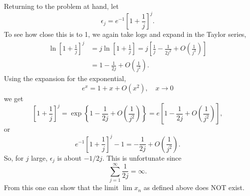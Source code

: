 \documentclass{stml-l}
\theoremstyle{definition}
\numberwithin{equation}{chapter}
\numberwithin{figure}{chapter}
\numberwithin{figure}{section}
\begin{document}
Returning to the problem at hand, let
\begin{equation*}
\epsilon_{j}=e^{-1}\left[1+\frac{1}{j}\right]^{j}.
\end{equation*}
To see how close this is to 1, we again take logs and expand in the Taylor series,
\begin{align*}
\ln\left[1+\frac{1}{j}\right]^{j}&=j\ln\left[1+\frac{1}{j}\right]=j\left[\frac{1}{j}-\frac{1}{2j^{2}}+O\left(\frac{1}{j^{3}}\right)\right]\\
&=1-\frac{1}{2j}+O\left(\frac{1}{j^{2}}\right).
\end{align*}
Using the expansion for the exponential,
\begin{equation*}
e^{x}=1+x+O(x^{2}),\quad x\rightarrow 0
\end{equation*}
we get
\begin{equation*}
\left[1+\frac{1}{j}\right]^{j}=\exp\left\{1-\frac{1}{2j}+O\left(\frac{1}{j^{2}}\right)\right\}=e\left[1-\frac{1}{2j}+O\left(\frac{1}{j^{2}}\right)\right],
\end{equation*}
or
\begin{equation*}
e^{-1}\left[1+\frac{1}{j}\right]^{j}-1=-\frac{1}{2j}+O\left(\frac{1}{j^{2}}\right).
\end{equation*}
So, for $j$ large, $\epsilon_{j}$ is about $-1/2j$. This is unfortunate since
\begin{equation*}
\sum\limits_{j=1}^{\infty}\frac{1}{2j}=\infty.
\end{equation*}
From this one can show that the limit $\lim x_{n}$ as defined above
does NOT exist.
\end{document}

